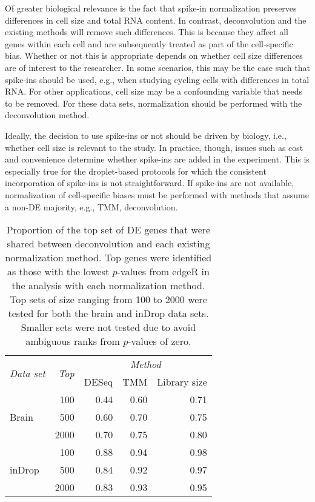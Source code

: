 \documentclass{article}
\begin{document}
Of greater biological relevance is the fact that spike-in normalization preserves differences in cell size and total RNA content.
In contrast, deconvolution and the existing methods will remove such differences.
This is because they affect all genes within each cell and are subsequently treated as part of the cell-specific bias.
Whether or not this is appropriate depends on whether cell size differences are of interest to the researcher.
In some scenarios, this may be the case such that spike-ins should be used, e.g., when studying cycling cells with differences in total RNA.
For other applications, cell size may be a confounding variable that needs to be removed.
For these data sets, normalization should be performed with the deconvolution method.

Ideally, the decision to use spike-ins or not should be driven by biology, i.e., whether cell size is relevant to the study.
In practice, though, issues such as cost and convenience determine whether spike-ins are added in the experiment.
This is especially true for the droplet-based protocols \cite{macosko2015highly,klein2015droplet} for which the consistent incorporation of spike-ins is not straightforward.
If spike-ins are not available, normalization of cell-specific biases must be performed with methods that assume a non-DE majority, e.g., TMM, deconvolution.

\begin{table}[ptb]
    \caption{
        Proportion of the top set of DE genes that were shared between deconvolution and each existing normalization method.
        Top genes were identified as those with the lowest $p$-values from edgeR in the analysis with each normalization method.
        Top sets of size ranging from 100 to 2000 were tested for both the brain and inDrop data sets.
        Smaller sets were not tested due to avoid ambiguous ranks from $p$-values of zero.
    }
    \begin{center}
        \begin{tabular}{l r r r r}
            \hline
            \multirow{2}{*}{\textit{Data set}} & \multirow{2}{*}{\textit{Top}} & \multicolumn{3}{c}{\textit{Method}} \\
                \cline{3-5}
                & & DESeq & TMM & Library size \\
            \hline
            \multirow{3}{*}{Brain}            
            & 100  & 0.44 & 0.60 & 0.71 \\ 
            & 500  & 0.60 & 0.70 & 0.75 \\
            & 2000 & 0.70 & 0.75 & 0.80 \\
            \hline
            \multirow{3}{*}{inDrop}            
            & 100  & 0.88 & 0.94 & 0.98 \\ 
            & 500  & 0.84 & 0.92 & 0.97 \\
            & 2000 & 0.83 & 0.93 & 0.95 \\
            \hline
        \end{tabular}
    \end{center}
\end{table}
\end{document}
